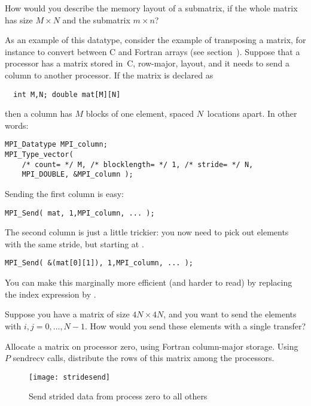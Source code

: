 \begin{exercise}
  \label{ex:submatrix}
  How would you describe the memory layout of a submatrix,
  if the whole matrix has size $M\times N$ and the submatrix $m\times n$?
\end{exercise}

As an example of this datatype, consider the example of transposing
a matrix, for instance to convert between
C and Fortran arrays (see section~). Suppose that 
a processor has a matrix stored in~C, row-major, layout, and it needs
to send a column to another processor. If the matrix is declared as
\begin{lstlisting}
  int M,N; double mat[M][N]
\end{lstlisting}
then a column has $M$ blocks of one element, spaced $N$~locations apart.
In other words:
\begin{lstlisting}
MPI_Datatype MPI_column;
MPI_Type_vector( 
    /* count= */ M, /* blocklength= */ 1, /* stride= */ N,
    MPI_DOUBLE, &MPI_column );
\end{lstlisting}
Sending the first column is easy:
\begin{lstlisting}
MPI_Send( mat, 1,MPI_column, ... );
\end{lstlisting}
The second column is just a little trickier: you now need to pick out 
elements with the same stride, but starting at .
\begin{lstlisting}
MPI_Send( &(mat[0][1]), 1,MPI_column, ... );
\end{lstlisting}
You can make this marginally more efficient (and harder to read)
by replacing the index expression by .

\begin{exercise}
  Suppose you have a matrix of size $4N\times 4N$, and you want to
  send the elements  with $i,j=0,\ldots,N-1$. How would
  you send these elements with a single transfer?
\end{exercise}

\begin{exercise}
  \label{ex:col-to-row}
  Allocate a matrix on processor zero, using Fortran column-major storage.
  Using $P$ sendrecv calls, distribute the rows of this matrix among the
  processors.
\end{exercise}

\begin{figure}[t]
  \texttt{[image: stridesend]}
  \caption{Send strided data from process zero to all others}
  \label{fig:stridesend}
\end{figure}

